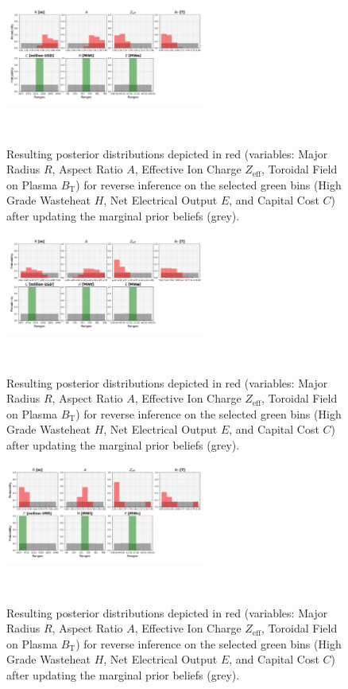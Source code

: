 \begin{figure}[ht]
    \centering
    \includegraphics[width=0.6\textwidth]{figures/TE_results/march_data/config(57)_3outputs_V2_1.png}
    \caption{Resulting posterior distributions depicted in red (variables: Major Radius $R$, Aspect Ratio $A$, Effective Ion Charge $Z_{\text{eff}}$, Toroidal Field on Plasma $B_{\text{T}}$) for reverse
    inference on the selected green bins (High Grade Wasteheat $H$, Net Electrical Output $E$, and  Capital Cost $C$) after updating the marginal prior beliefs (grey).}~\label{fig:config(57)_3outputs_V2_1}
\end{figure}

\begin{figure}[ht]
    \centering
    \includegraphics[width=0.6\textwidth]{figures/TE_results/march_data/config(57)_3outputs_V2_2.png}
    \caption{Resulting posterior distributions depicted in red (variables: Major Radius $R$, Aspect Ratio $A$, Effective Ion Charge $Z_{\text{eff}}$, Toroidal Field on Plasma $B_{\text{T}}$) for reverse
    inference on the selected green bins (High Grade Wasteheat $H$, Net Electrical Output $E$, and  Capital Cost $C$) after updating the marginal prior beliefs (grey).}~\label{fig:config(57)_3outputs_V2_2}
\end{figure}

\begin{figure}[ht]
    \centering
    \includegraphics[width=0.6\textwidth]{figures/TE_results/march_data/config(57)_3outputs_V2_3.png}
    \caption{Resulting posterior distributions depicted in red (variables: Major Radius $R$, Aspect Ratio $A$, Effective Ion Charge $Z_{\text{eff}}$, Toroidal Field on Plasma $B_{\text{T}}$) for reverse
    inference on the selected green bins (High Grade Wasteheat $H$, Net Electrical Output $E$, and  Capital Cost $C$) after updating the marginal prior beliefs (grey).}~\label{fig:config(57)_3outputs_V2_3}
\end{figure}


